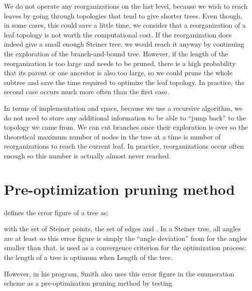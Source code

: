 \documentclass{article}
\theoremstyle{plain}
\begin{document}
We do not operate any reorganizations on the last level, because we wish to reach leaves by going through topologies that tend to give shorter trees. 
Even though, in some cases, this could save a little time, we consider that a reorganization of a leaf topology is not worth the computational cost. 
If the reorganization does indeed give a small enough Steiner tree, we would reach it anyway by continuing the exploration of the \mbox{branch-and-bound} tree. 
However, if the length of the reorganization is too large and needs to be pruned, there is a high probability that its parent or one ancestor is also too large, so we could prune the whole subtree and save the time required to optimize the leaf topology. 
In practice, the second case occurs much more often than the first case. 

In terms of implementation and space, because we use a recursive algorithm, we do not need to store any additional information to be able to ``jump back'' to the topology we came from. 
We can cut branches once their exploration is over so the theoretical maximum number of nodes in the tree at a time is number of reorganizations to reach the current leaf. 
In practice, reorganizations occur often enough so this number is actually almost never reached.










\FloatBarrier











\section{Pre-optimization pruning method}
\label{sec:pruning}

\cite{Smith} defines the error figure  of a tree as: 

with  the set of Steiner points,  the set of edges and . In a Steiner tree, all angles are at least  so this error figure is simply the ``angle deviation'' from  for the angles smaller than that.  is used as a convergence criterion for the optimization process: the length of a tree is optimum when Length of the tree.

However, in his program, Smith also uses this error figure in the enumeration scheme as a pre-optimization pruning method by testing
\end{document}
